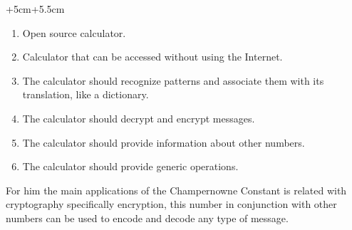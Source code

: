 \documentclass[../main.tex]{subfiles} %
\begin{document}
\begin{changemargin}{+5cm}{+5.5cm}


\begin{enumerate}
 
   \item Open source calculator.
   \item Calculator that can be accessed without using the Internet.
   \item The calculator should recognize patterns and associate them with its translation, like a dictionary.
   \item The calculator should decrypt and encrypt messages.
   \item The calculator should provide information about other numbers.
   \item The calculator should provide generic operations.
    \newline  
\end{enumerate}



For him the main applications of the Champernowne Constant is related with cryptography specifically encryption, this number in conjunction with other numbers can be used to encode and decode any type of message. \newline

\end{changemargin}
\end{document}
